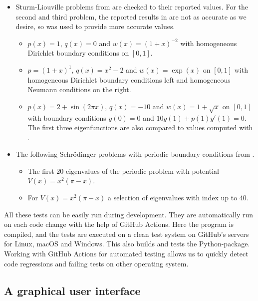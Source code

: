 \begin{itemize}
\begin{itemize}
          \end{itemize}
    \item Sturm-Liouville problems from \cite{siedlecki_sturmliouville_2016} are checked to their reported values. For the second and third problem, the reported results in \cite{siedlecki_sturmliouville_2016} are not as accurate as we desire, so  was used to provide more accurate values.
          \begin{itemize}
              \item $p(x)=1$, $q(x)=0$ and $w(x)=(1+x)^{-2}$ with homogeneous Dirichlet boundary conditions on $[0, 1]$.
              \item $p=(1+x)^1$, $q(x) = x^2-2$ and $w(x) = \exp(x)$ on $[0, 1]$ with homogeneous Dirichlet boundary conditions left and homogeneous Neumann conditions on the right.
              \item $p(x) = 2+\sin(2 \pi x)$, $q(x) = -10$ and $w(x) = 1+\sqrt{x}$ on $[0, 1]$ with boundary conditions $y(0) = 0$ and $10 y(1) + p(1) y'(1) = 0$. The first three eigenfunctions are also compared to values computed with .
          \end{itemize}
    \item The following Schrödinger problems with periodic boundary conditions from \cite{andrew_correction_1989}.
          \begin{itemize}
              \item The first $20$ eigenvalues of the periodic problem with potential $V(x) = x^2(\pi - x)$.
              \item For $V(x) = x^2(\pi - x)$ a selection of eigenvalues with index up to $40$.
          \end{itemize}
\end{itemize}

All these tests can be easily run during development. They are automatically run on each code change with the help of GitHub Actions. Here the program is compiled, and the tests are executed on a clean test system on GitHub's servers for Linux, macOS and Windows. This also builds and tests the Python-package. Working with GitHub Actions for automated testing allows us to quickly detect code regressions and failing tests on other operating system.

\subsection{A graphical user interface}\label{sec:c2_online_gui}

